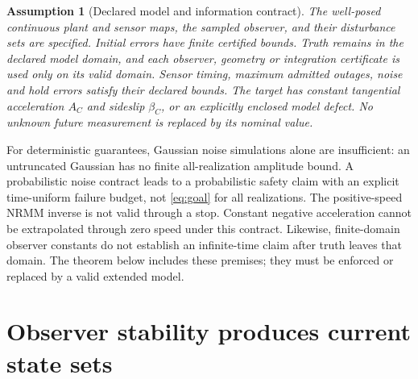 \documentclass[10pt,letterpaper]{article}
\newtheorem{assumption}{Assumption}
\begin{document}
\begin{assumption}[Declared model and information contract]\label{ass:contract}
The well-posed continuous plant and sensor maps, the sampled observer, and their
disturbance sets are specified. Initial errors have finite certified bounds.
Truth remains in the declared model domain, and each observer, geometry or
integration certificate is used only on its valid domain. Sensor timing, maximum admitted outages,
noise and hold errors satisfy their declared bounds. The target has constant
tangential acceleration $A_C$ and sideslip $\beta_C$, or an explicitly enclosed
model defect. No unknown future measurement is replaced by its nominal value.
\end{assumption}
For deterministic guarantees, Gaussian noise simulations alone are insufficient:
an untruncated Gaussian has no finite all-realization amplitude bound. A
probabilistic noise contract leads to a probabilistic safety claim with an
explicit time-uniform failure budget, not \eqref{eq:goal} for all realizations.
The positive-speed NRMM inverse is not valid through a stop. Constant negative
acceleration cannot be extrapolated through zero speed under this contract.
Likewise, finite-domain observer constants do not establish an infinite-time
claim after truth leaves that domain. The theorem below includes these premises;
they must be enforced or replaced by a valid extended model.

\section{Observer stability produces current state sets}
\end{document}

